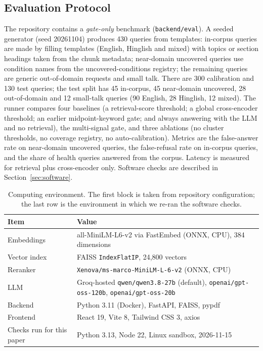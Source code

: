\documentclass[10pt,a4paper]{article}
\newcommand{\code}[1]{\texttt{\small #1}}
\begin{document}
\subsection{Evaluation Protocol}
The repository contains a \emph{gate-only} benchmark (\code{backend/eval}). A seeded generator (seed 20261104) produces 430 queries from templates: in-corpus queries are made by filling templates (English, Hinglish and mixed) with topics or section headings taken from the chunk metadata; near-domain uncovered queries use condition names from the uncovered-conditions registry; the remaining queries are generic out-of-domain requests and small talk. There are 300 calibration and 130 test queries; the test split has 45 in-corpus, 45 near-domain uncovered, 28 out-of-domain and 12 small-talk queries (90 English, 28 Hinglish, 12 mixed). The runner compares four baselines (a retrieval-score threshold; a global cross-encoder threshold; an earlier midpoint-keyword gate; and always answering with the LLM and no retrieval), the multi-signal gate, and three ablations (no cluster thresholds, no coverage registry, no auto-calibration). Metrics are the false-answer rate on near-domain uncovered queries, the false-refusal rate on in-corpus queries, and the share of health queries answered from the corpus. Latency is measured for retrieval plus cross-encoder only. Software checks are described in Section~\ref{sec:software}.

\begin{table}[t]
\centering\small
\caption{Computing environment. The first block is taken from repository configuration; the last row is the environment in which we re-ran the software checks.}
\label{tab:env}
\begin{tabular}{p{3.6cm}p{11cm}}
\toprule
Item & Value\\
\midrule
Embeddings & all-MiniLM-L6-v2 via FastEmbed (ONNX, CPU), 384 dimensions\\
Vector index & FAISS \code{IndexFlatIP}, 24,800 vectors\\
Reranker & \code{Xenova/ms-marco-MiniLM-L-6-v2} (ONNX, CPU)\\
LLM & Groq-hosted \code{qwen/qwen3.8-27b} (default), \code{openai/gpt-oss-120b}, \code{openai/gpt-oss-20b}\\
Backend & Python 3.11 (Docker), FastAPI, FAISS, pypdf\\
Frontend & React 19, Vite 8, Tailwind CSS 3, axios\\
Checks run for this paper & Python 3.13, Node 22, Linux sandbox, 2026-11-15\\
\bottomrule
\end{tabular}
\end{table}
\end{document}
